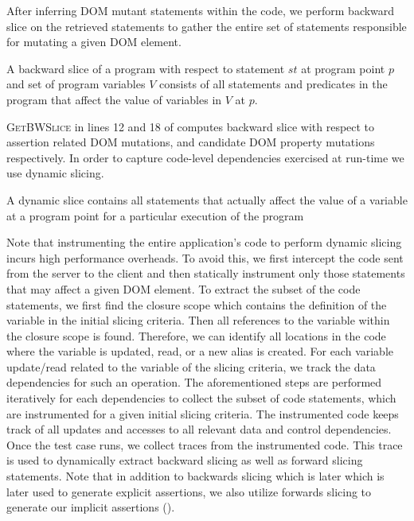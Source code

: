After inferring DOM mutant statements within the code, we perform backward slice on the retrieved statements to gather the entire set of \javascript statements responsible for mutating a given DOM element.
\begin{mydef}
\label{def:backwardSlicing}  
A backward slice of a program with respect to statement $st$ at program point $p$ and set of program variables $V$ consists of all statements and predicates in the program that affect the value of variables in $V$ at $p$.
\end{mydef}
\textsc{GetBWSlice} in lines  12 and 18 of  computes backward slice with respect to assertion related DOM mutations, and candidate DOM property mutations respectively.
In order to capture code-level dependencies exercised at run-time we use dynamic slicing.
\begin{mydef}
\label{def:dynamicSlicing}
A dynamic slice contains all statements that actually affect the value of a variable at a program point for a particular execution of the program 
\end{mydef}
Note that instrumenting the entire application's code to perform dynamic slicing incurs high performance overheads. To avoid this, we first intercept the code sent from the server to the client and then statically instrument only those statements that may affect a given DOM element.
To extract the subset of the code statements, we first find the \javascript closure scope which contains the definition of the variable in the initial slicing criteria. Then all references to the variable within the closure scope is found. Therefore, we can identify all locations in the code where the variable is updated, read, or a new alias is created. For each variable update/read related to the variable of the slicing criteria, we track the data dependencies for such an operation. The aforementioned steps are performed iteratively for each dependencies to collect the subset of code statements, which are instrumented for a given initial slicing criteria.
The instrumented code keeps track of all updates and accesses to all relevant data and control dependencies.   
Once the test case runs, we collect traces from the instrumented code. This trace is used to dynamically extract backward slicing as well as forward slicing statements. Note that in addition to backwards slicing which is later which is later used to generate explicit assertions, we also utilize forwards slicing to generate our implicit assertions ().  

